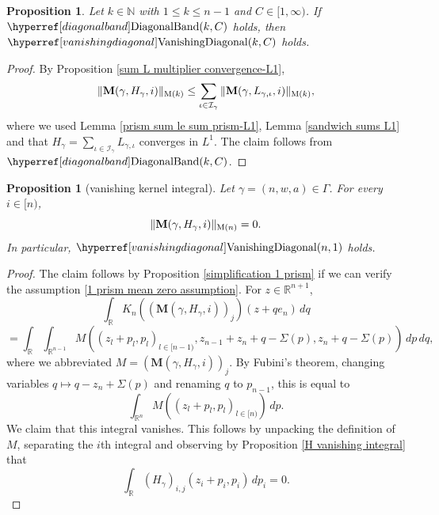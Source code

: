 \documentclass[12pt,reqno]{amsart}
\theoremstyle{plain}
\newtheorem{proposition}[theorem]{Proposition}
\numberwithin{equation}{section}
\theoremstyle{remark}
\newcommand{\using}[1]{}
\newcommand{\R}{{\mathbb R}}
\newcommand{\N}{{\mathbb N}}
\newcommand{\M}{\mathbf{M}}
\begin{document}
\begin{proposition}
\label{diagonal band implies vanishing diagonal}\using{sum L multiplier convergence-L1}\using{prism sum le sum prism-L1}\using{sandwich sums L1}
Let $k\in\N$ with $1\le k\le n-1$ and $C\in [1,\infty)$.
If $\DiagonalBand{k,C}$ holds, then $\VanishingDiagonal{k,C}$ holds.
\end{proposition}

\begin{proof}
By Proposition \ref{sum L multiplier convergence-L1},
\[ \|\M(\gamma,H_\gamma,i)\|_{{\rm M}(k)} \le \sum_{\iota \in \mathcal{I}_{\gamma}} \|\M(\gamma,L_{\gamma,\iota},i)\|_{{\rm M}(k)}, \]
where we used Lemma \ref{prism sum le sum prism-L1}, Lemma \ref{sandwich sums L1} and that $H_\gamma=\sum_{\iota\in \mathcal{I}_{\gamma}} L_{\gamma,\iota}$ converges in $L^1$.
The claim follows from $\DiagonalBand{k,C}$.
\end{proof}

\begin{proposition}[vanishing kernel integral]\label{vanishing kernel integral}\using{simplification 1 prism}\using{H vanishing integral}
Let $\gamma=(n,w,a)\in \Gamma$.
For every $i\in [n)$,
\begin{equation}\label{auto:terminal-H-prism-form-zero}
    \|\M(\gamma,H_\gamma,i)\|_{{\rm M}(n)}=0.
\end{equation}
In particular, $\VanishingDiagonal{n,1}$ holds.
\end{proposition}

\begin{proof}
The claim follows by Proposition \ref{simplification 1 prism} if we can verify the assumption \eqref{1 prism mean zero assumption}.
For $z\in \R^{n+1}$,
\begin{equation}
\int_\R K_n((\M(\gamma,H_\gamma,i))_j)(z+qe_n)\,dq
\end{equation}
\begin{equation}
=\int_\R \int_{\R^{n-1}}  M((z_{l}+p_{l},p_{l})_{l\in [n-1)}, z_{n-1}+z_{n}+q-\Sigma(p),z_{n}+q-\Sigma(p))\,dp\,dq,
\end{equation}
where we abbreviated $M=(\M(\gamma,H_\gamma, i))_j$.
By Fubini's theorem, changing variables $q\mapsto q - z_n + \Sigma(p)$ and renaming $q$ to $p_{n-1}$, this is equal to
\begin{equation}
\int_{\R^{n}}  M((z_{l}+p_{l},p_{l})_{l\in [n)})
 \,dp.
\end{equation}
We claim that this integral vanishes. This follows by unpacking the definition of $M$, separating the $i$th integral and
observing by Proposition \ref{H vanishing integral} that
\begin{equation}
        \int_{\R}  (H_\gamma)_{i,j}(z_{i}+p_{i},p_{i})
     \,dp_i=0.
\end{equation}
\end{proof}
\end{document}

